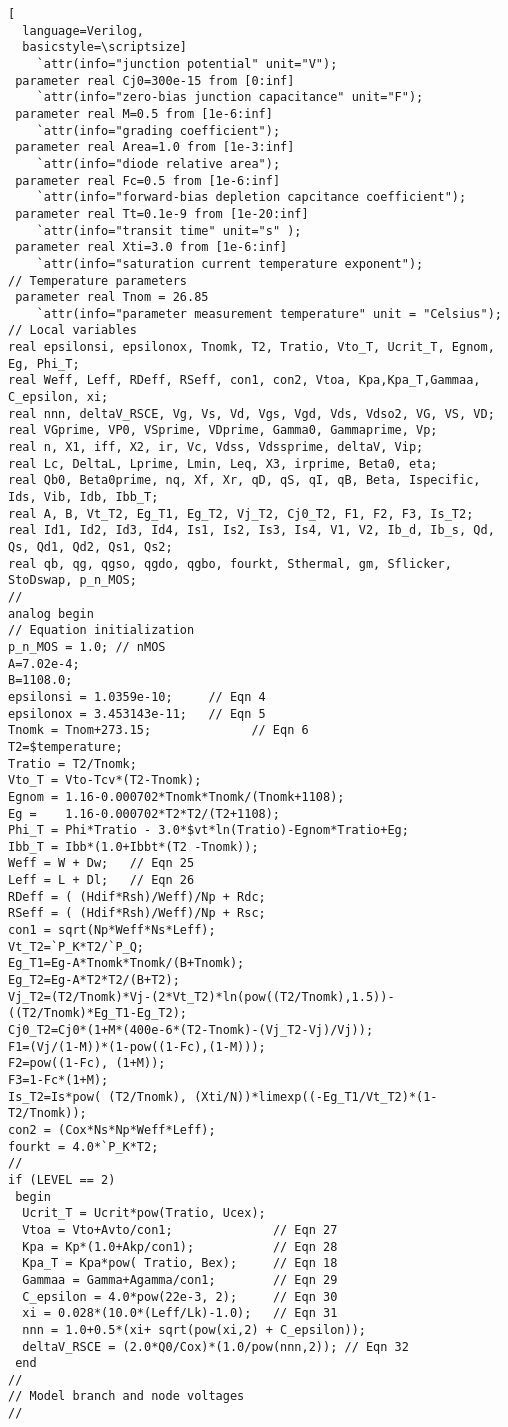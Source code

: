\begin{lstlisting}[
  language=Verilog,
  basicstyle=\scriptsize]
	`attr(info="junction potential" unit="V");
 parameter real Cj0=300e-15 from [0:inf]         
	`attr(info="zero-bias junction capacitance" unit="F");
 parameter real M=0.5 from [1e-6:inf]          
	`attr(info="grading coefficient");
 parameter real Area=1.0 from [1e-3:inf]       
	`attr(info="diode relative area");
 parameter real Fc=0.5 from [1e-6:inf]         
	`attr(info="forward-bias depletion capcitance coefficient");
 parameter real Tt=0.1e-9 from [1e-20:inf]     
	`attr(info="transit time" unit="s" );
 parameter real Xti=3.0 from [1e-6:inf]        
	`attr(info="saturation current temperature exponent");
// Temperature parameters
 parameter real Tnom = 26.85                   
	`attr(info="parameter measurement temperature" unit = "Celsius");
// Local variables
real epsilonsi, epsilonox, Tnomk, T2, Tratio, Vto_T, Ucrit_T, Egnom, Eg, Phi_T;
real Weff, Leff, RDeff, RSeff, con1, con2, Vtoa, Kpa,Kpa_T,Gammaa, C_epsilon, xi;
real nnn, deltaV_RSCE, Vg, Vs, Vd, Vgs, Vgd, Vds, Vdso2, VG, VS, VD;
real VGprime, VP0, VSprime, VDprime, Gamma0, Gammaprime, Vp;
real n, X1, iff, X2, ir, Vc, Vdss, Vdssprime, deltaV, Vip;
real Lc, DeltaL, Lprime, Lmin, Leq, X3, irprime, Beta0, eta;
real Qb0, Beta0prime, nq, Xf, Xr, qD, qS, qI, qB, Beta, Ispecific, Ids, Vib, Idb, Ibb_T;
real A, B, Vt_T2, Eg_T1, Eg_T2, Vj_T2, Cj0_T2, F1, F2, F3, Is_T2;
real Id1, Id2, Id3, Id4, Is1, Is2, Is3, Is4, V1, V2, Ib_d, Ib_s, Qd, Qs, Qd1, Qd2, Qs1, Qs2;
real qb, qg, qgso, qgdo, qgbo, fourkt, Sthermal, gm, Sflicker, StoDswap, p_n_MOS;
//
analog begin
// Equation initialization
p_n_MOS = 1.0; // nMOS
A=7.02e-4;
B=1108.0;
epsilonsi = 1.0359e-10;     // Eqn 4
epsilonox = 3.453143e-11;   // Eqn 5
Tnomk = Tnom+273.15;              // Eqn 6
T2=$temperature;
Tratio = T2/Tnomk;
Vto_T = Vto-Tcv*(T2-Tnomk);
Egnom = 1.16-0.000702*Tnomk*Tnomk/(Tnomk+1108);
Eg =    1.16-0.000702*T2*T2/(T2+1108);
Phi_T = Phi*Tratio - 3.0*$vt*ln(Tratio)-Egnom*Tratio+Eg;
Ibb_T = Ibb*(1.0+Ibbt*(T2 -Tnomk));
Weff = W + Dw;   // Eqn 25
Leff = L + Dl;   // Eqn 26
RDeff = ( (Hdif*Rsh)/Weff)/Np + Rdc;
RSeff = ( (Hdif*Rsh)/Weff)/Np + Rsc;
con1 = sqrt(Np*Weff*Ns*Leff);
Vt_T2=`P_K*T2/`P_Q;
Eg_T1=Eg-A*Tnomk*Tnomk/(B+Tnomk);
Eg_T2=Eg-A*T2*T2/(B+T2);
Vj_T2=(T2/Tnomk)*Vj-(2*Vt_T2)*ln(pow((T2/Tnomk),1.5))-((T2/Tnomk)*Eg_T1-Eg_T2);
Cj0_T2=Cj0*(1+M*(400e-6*(T2-Tnomk)-(Vj_T2-Vj)/Vj));
F1=(Vj/(1-M))*(1-pow((1-Fc),(1-M)));
F2=pow((1-Fc), (1+M));
F3=1-Fc*(1+M);
Is_T2=Is*pow( (T2/Tnomk), (Xti/N))*limexp((-Eg_T1/Vt_T2)*(1-T2/Tnomk));
con2 = (Cox*Ns*Np*Weff*Leff);
fourkt = 4.0*`P_K*T2;
//
if (LEVEL == 2)
 begin
  Ucrit_T = Ucrit*pow(Tratio, Ucex);
  Vtoa = Vto+Avto/con1;              // Eqn 27
  Kpa = Kp*(1.0+Akp/con1);           // Eqn 28
  Kpa_T = Kpa*pow( Tratio, Bex);     // Eqn 18
  Gammaa = Gamma+Agamma/con1;        // Eqn 29
  C_epsilon = 4.0*pow(22e-3, 2);     // Eqn 30
  xi = 0.028*(10.0*(Leff/Lk)-1.0);   // Eqn 31
  nnn = 1.0+0.5*(xi+ sqrt(pow(xi,2) + C_epsilon));
  deltaV_RSCE = (2.0*Q0/Cox)*(1.0/pow(nnn,2)); // Eqn 32
 end
//
// Model branch and node voltages
//


\end{lstlisting}
